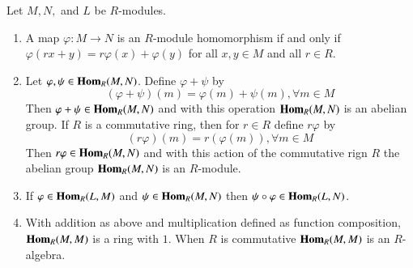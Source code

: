 \documentclass[12pt, a4paper, oneside, openright, titlepage]{book}
\begin{document}
\begin{prop}
    Let $M, N,$ and $L$ be $R$-modules. 
    \begin{enumerate}
        \item A map $\varphi:M\rightarrow N$ is an $R$-module homomorphism if and only if $\varphi(rx+y) = r\varphi(x)+\varphi(y)$ for all $x,y \in M$ and all $r \in R$.
        \item Let $\varphi,\psi \in \mathbf{Hom}_R(M,N)$. Define $\varphi+\psi$ by \begin{equation*}
                (\varphi+\psi)(m) = \varphi(m)+\psi(m),\forall m \in M
        \end{equation*}
            Then $\varphi+\psi \in \mathbf{Hom}_R(M,N)$ and with this operation $\mathbf{Hom}_R(M,N)$ is an abelian group. If $R$ is a commutative ring, then for $r \in R$ define $r\varphi$ by\begin{equation*}
                (r\varphi)(m) = r(\varphi(m)),\forall m \in M
            \end{equation*}
            Then $r\varphi \in \mathbf{Hom}_R(M,N)$ and with this action of the commutative rign $R$ the abelian group $\mathbf{Hom}_R(M,N)$ is an $R$-module.
        \item If $\varphi \in \mathbf{Hom}_R(L,M)$ and $\psi\in \mathbf{Hom}_R(M,N)$ then $\psi\circ \varphi \in \mathbf{Hom}_R(L,N)$.
        \item With addition as above and multiplication defined as function composition, $\mathbf{Hom}_R(M,M)$ is a ring with $1$. When $R$ is commutative $\mathbf{Hom}_R(M,M)$ is an $R$-algebra.
    \end{enumerate}
\end{prop}
\end{document}
